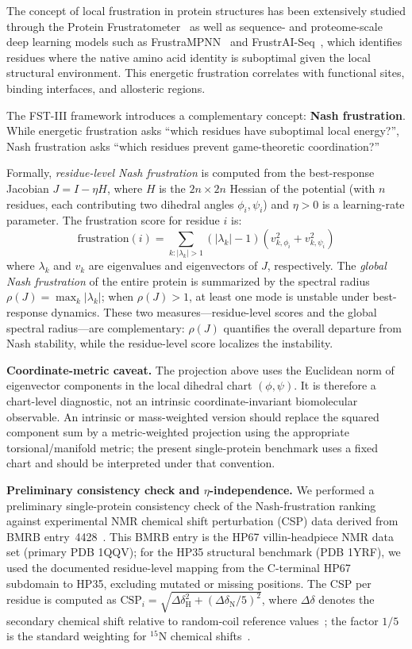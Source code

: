 \documentclass[12pt,a4paper]{article}
\theoremstyle{remark}
\begin{document}
The concept of local frustration in protein structures has been extensively studied through the Protein Frustratometer~\citep{Ferreiro2007,Ferreiro2014} as well as sequence- and proteome-scale deep learning models such as FrustraMPNN~\citep{Beining2026} and FrustrAI-Seq~\citep{Leusch2026}, which identifies residues where the native amino acid identity is suboptimal given the local structural environment. This energetic frustration correlates with functional sites, binding interfaces, and allosteric regions.

The FST-III framework introduces a complementary concept: \textbf{Nash frustration}. While energetic frustration asks ``which residues have suboptimal local energy?'', Nash frustration asks ``which residues prevent game-theoretic coordination?''

Formally, \emph{residue-level Nash frustration} is computed from the best-response Jacobian $J = I - \eta H$, where $H$ is the $2n \times 2n$ Hessian of the potential (with $n$ residues, each contributing two dihedral angles $\phi_i, \psi_i$) and $\eta > 0$ is a learning-rate parameter. The frustration score for residue $i$ is:
\begin{equation}
\text{frustration}(i) = \sum_{k: |\lambda_k| > 1} (|\lambda_k| - 1) \left( v_{k,\phi_i}^2 + v_{k,\psi_i}^2 \right)
\end{equation}
where $\lambda_k$ and $v_k$ are eigenvalues and eigenvectors of $J$, respectively. The \emph{global Nash frustration} of the entire protein is summarized by the spectral radius $\rho(J) = \max_k |\lambda_k|$; when $\rho(J) > 1$, at least one mode is unstable under best-response dynamics. These two measures---residue-level scores and the global spectral radius---are complementary: $\rho(J)$ quantifies the overall departure from Nash stability, while the residue-level score localizes the instability.

\textbf{Coordinate-metric caveat.}
The projection above uses the Euclidean norm of eigenvector components in the local dihedral chart $(\phi,\psi)$. It is therefore a chart-level diagnostic, not an intrinsic coordinate-invariant biomolecular observable. An intrinsic or mass-weighted version should replace the squared component sum by a metric-weighted projection using the appropriate torsional/manifold metric; the present single-protein benchmark uses a fixed chart and should be interpreted under that convention.

\textbf{Preliminary consistency check and $\eta$-independence.}
We performed a preliminary single-protein consistency check of the Nash-frustration ranking against experimental NMR chemical shift perturbation (CSP) data derived from BMRB entry~4428~\cite{BMRB4428}. This BMRB entry is the HP67 villin-headpiece NMR data set (primary PDB 1QQV); for the HP35 structural benchmark (PDB 1YRF), we used the documented residue-level mapping from the C-terminal HP67 subdomain to HP35, excluding mutated or missing positions. The CSP per residue is computed as $\text{CSP}_i = \sqrt{\Delta\delta_{\text{H}}^2 + (\Delta\delta_{\text{N}}/5)^2}$, where $\Delta\delta$ denotes the secondary chemical shift relative to random-coil reference values~\cite{Wishart1995}; the factor $1/5$ is the standard weighting for ${}^{15}$N chemical shifts~\cite{Williamson2013}.
\end{document}
